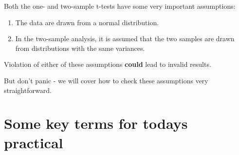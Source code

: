 \documentclass[
]{book}
\providecommand{\tightlist}{%
  \setlength{\itemsep}{0pt}\setlength{\parskip}{0pt}}
\begin{document}
Both the one- and two-sample t-tests have some very important assumptions:

\begin{enumerate}
\def\labelenumi{\arabic{enumi})}
\tightlist
\item
  The data are drawn from a normal distribution.
\item
  In the two-sample analysis, it is assumed that the two samples are drawn from distributions with the same variances.
\end{enumerate}

Violation of either of these assumptions \textbf{could} lead to invalid results.

But don't panic - we will cover how to check these assumptions very straightforward.

\hypertarget{some-key-terms-for-todays-practical}{%
\section{Some key terms for todays practical}\label{some-key-terms-for-todays-practical}}
\end{document}
